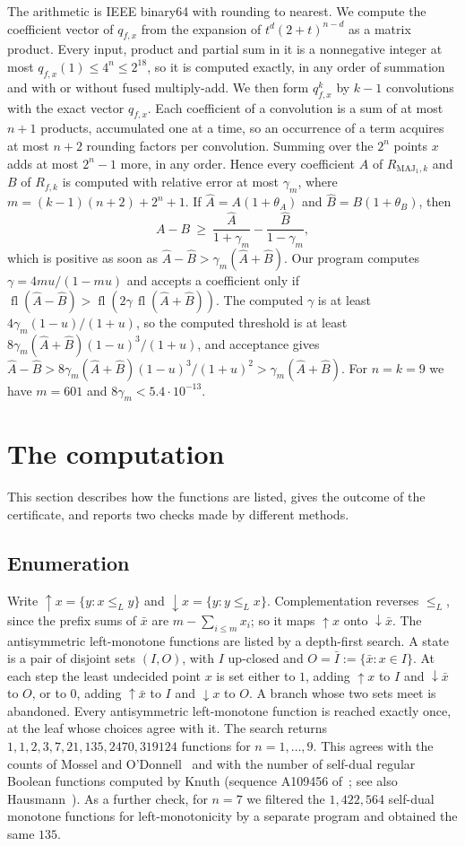 \documentclass[11pt]{amsart}
\theoremstyle{remark}
\newcommand{\MAJ}{\mathrm{MAJ}}
\newcommand{\fl}{\operatorname{fl}}
\begin{document}
The arithmetic is IEEE binary64 with rounding to nearest. We compute the coefficient vector of $q_{f,x}$ from the
expansion of $t^d(2+t)^{n-d}$ as a matrix product. Every input, product and partial sum in it is a nonnegative integer
at most $q_{f,x}(1)\le4^n\le2^{18}$, so it is computed exactly, in any order of summation and with or without fused
multiply-add. We then form $q_{f,x}^k$ by $k-1$ convolutions with the exact vector $q_{f,x}$. Each coefficient of a
convolution is a sum of at most $n+1$ products, accumulated one at a time, so an occurrence of a term acquires at most
$n+2$ rounding factors per convolution. Summing over the $2^n$ points $x$ adds at most $2^n-1$ more, in any order.
Hence every coefficient $A$ of $R_{\MAJ_1,k}$ and $B$ of $R_{f,k}$ is computed with relative error at most $\gamma_m$,
where $m=(k-1)(n+2)+2^n+1$. If $\hat A=A(1+\theta_A)$ and $\hat B=B(1+\theta_B)$, then
\[
  A-B\ \ge\ \frac{\hat A}{1+\gamma_m}-\frac{\hat B}{1-\gamma_m},
\]
which is positive as soon as $\hat A-\hat B>\gamma_m(\hat A+\hat B)$. Our program computes $\gamma=4mu/(1-mu)$ and
accepts a coefficient only if $\fl(\hat A-\hat B)>\fl(2\gamma\,\fl(\hat A+\hat B))$. The computed $\gamma$ is at least
$4\gamma_m(1-u)/(1+u)$, so the computed threshold is at least $8\gamma_m(\hat A+\hat B)(1-u)^3/(1+u)$, and acceptance
gives $\hat A-\hat B>8\gamma_m(\hat A+\hat B)(1-u)^3/(1+u)^2>\gamma_m(\hat A+\hat B)$. For $n=k=9$ we have $m=601$ and
$8\gamma_m<5.4\cdot10^{-13}$.

\section{The computation}\label{sec:comp}

This section describes how the functions are listed, gives the outcome of the certificate, and reports two checks
made by different methods.

\subsection*{Enumeration}
Write $\uparrow\!x=\{y:x\le_L y\}$ and $\downarrow\!x=\{y:y\le_L x\}$. Complementation reverses $\le_L$, since the
prefix sums of $\bar x$ are $m-\sum_{i\le m}x_i$; so it maps $\uparrow\!x$ onto $\downarrow\!\bar x$. The antisymmetric
left-monotone functions are listed by a depth-first search. A state is a pair of disjoint sets $(I,O)$, with $I$
up-closed and $O=\bar I:=\{\bar x:x\in I\}$. At each step the least undecided point $x$ is set either to $1$, adding $\uparrow\!x$ to $I$
and $\downarrow\!\bar x$ to $O$, or to $0$, adding $\uparrow\!\bar x$ to $I$ and $\downarrow\!x$ to $O$. A branch
whose two sets meet is abandoned. Every antisymmetric left-monotone function is reached exactly once, at the leaf
whose choices agree with it. The search returns $1,1,2,3,7,21,135,2470,319124$ functions for $n=1,\dots,9$. This
agrees with the counts of Mossel and O'Donnell~\cite{MO05} and with the number of self-dual regular Boolean functions
computed by Knuth (sequence A109456 of~\cite{OEIS}; see also Hausmann~\cite{Hau15}). As a further check, for $n=7$ we
filtered the $1{,}422{,}564$ self-dual monotone functions for left-monotonicity by a separate program and obtained the
same $135$.
\end{document}
